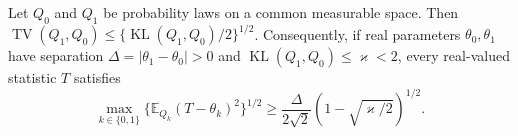Let \(Q_0\) and \(Q_1\) be probability laws on a common measurable space. Then \(\operatorname{TV}(Q_1,Q_0)\le\{\operatorname{KL}(Q_1,Q_0)/2\}^{1/2}\). Consequently, if real parameters \(\theta_0,\theta_1\) have separation \(\Delta=|\theta_1-\theta_0|>0\) and \(\operatorname{KL}(Q_1,Q_0)\le\varkappa<2\), every real-valued statistic \(T\) satisfies \[\max_{k\in\{0,1\}}\{\mathbb E_{Q_k}(T-\theta_k)^2\}^{1/2}\ge\frac{\Delta}{2\sqrt2}\left(1-\sqrt{\varkappa/2}\right)^{1/2}.\]